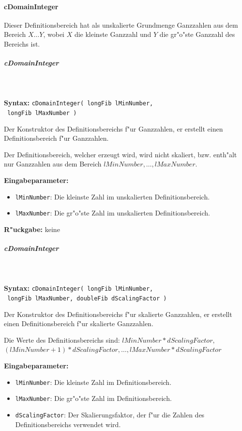 \paragraph{cDomainInteger}

Dieser Definitionsbereich hat als unskalierte Grundmenge Ganzzahlen aus dem Bereich $X \ldots Y$, wobei $X$ die kleinste Ganzzahl und $Y$ die gr"o"ste Ganzzahl des Bereichs ist.


\subparagraph{cDomainInteger}

\ \\\\\noindent
\textbf{Syntax:} \verb|cDomainInteger( longFib lMinNumber,| \\\verb| longFib lMaxNumber )|

\bigskip\noindent
Der Konstruktor des Definitionsbereichs f"ur Ganzzahlen, er erstellt einen Definitionsbereich f"ur Ganzzahlen.

Der Definitionsbereich, welcher erzeugt wird, wird nicht skaliert, bzw. enth"alt nur Ganzzahlen aus dem Bereich $lMinNumber, \ldots , lMaxNumber$.

\bigskip\noindent
\textbf{Eingabeparameter:}
\begin{itemize}
 \item \verb|lMinNumber|: Die kleinste Zahl im unskalierten Definitionsbereich.
 \item \verb|lMaxNumber|: Die gr"o"ste Zahl im unskalierten Definitionsbereich.
\end{itemize}

\bigskip\noindent
\textbf{R"uckgabe:} keine


\subparagraph{cDomainInteger}

\ \\\\\noindent
\textbf{Syntax:} \verb|cDomainInteger( longFib lMinNumber,| \\\verb| longFib lMaxNumber, doubleFib dScalingFactor )|

\bigskip\noindent
Der Konstruktor des Definitionsbereichs f"ur skalierte Ganzzahlen, er erstellt einen Definitionsbereich f"ur skalierte Ganzzahlen.

\bigskip\noindent
Die Werte des Definitionsbereichs sind: $lMinNumber*dScalingFactor,$ \\$(lMinNumber+1)*dScalingFactor, \ldots , lMaxNumber*dScalingFactor$

\bigskip\noindent
\textbf{Eingabeparameter:}
\begin{itemize}
 \item \verb|lMinNumber|: Die kleinste Zahl im Definitionsbereich.
 \item \verb|lMaxNumber|: Die gr"o"ste Zahl im Definitionsbereich.
 \item \verb|dScalingFactor|: Der Skalierungsfaktor, der f"ur die Zahlen des Definitionsbereichs verwendet wird.
\end{itemize}

